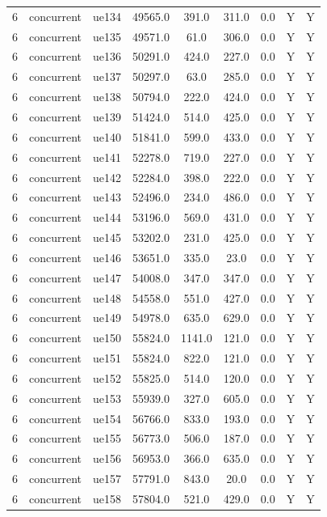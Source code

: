 \begin{table}[ht]
\begin{tabular}{|c|c|c|c|c|c|c|c|c|}
6 & concurrent & ue134 & 49565.0 & 391.0 & 311.0 & 0.0 & Y & Y \\
6 & concurrent & ue135 & 49571.0 & 61.0 & 306.0 & 0.0 & Y & Y \\
6 & concurrent & ue136 & 50291.0 & 424.0 & 227.0 & 0.0 & Y & Y \\
6 & concurrent & ue137 & 50297.0 & 63.0 & 285.0 & 0.0 & Y & Y \\
6 & concurrent & ue138 & 50794.0 & 222.0 & 424.0 & 0.0 & Y & Y \\
6 & concurrent & ue139 & 51424.0 & 514.0 & 425.0 & 0.0 & Y & Y \\
6 & concurrent & ue140 & 51841.0 & 599.0 & 433.0 & 0.0 & Y & Y \\
6 & concurrent & ue141 & 52278.0 & 719.0 & 227.0 & 0.0 & Y & Y \\
6 & concurrent & ue142 & 52284.0 & 398.0 & 222.0 & 0.0 & Y & Y \\
6 & concurrent & ue143 & 52496.0 & 234.0 & 486.0 & 0.0 & Y & Y \\
6 & concurrent & ue144 & 53196.0 & 569.0 & 431.0 & 0.0 & Y & Y \\
6 & concurrent & ue145 & 53202.0 & 231.0 & 425.0 & 0.0 & Y & Y \\
6 & concurrent & ue146 & 53651.0 & 335.0 & 23.0 & 0.0 & Y & Y \\
6 & concurrent & ue147 & 54008.0 & 347.0 & 347.0 & 0.0 & Y & Y \\
6 & concurrent & ue148 & 54558.0 & 551.0 & 427.0 & 0.0 & Y & Y \\
6 & concurrent & ue149 & 54978.0 & 635.0 & 629.0 & 0.0 & Y & Y \\
6 & concurrent & ue150 & 55824.0 & 1141.0 & 121.0 & 0.0 & Y & Y \\
6 & concurrent & ue151 & 55824.0 & 822.0 & 121.0 & 0.0 & Y & Y \\
6 & concurrent & ue152 & 55825.0 & 514.0 & 120.0 & 0.0 & Y & Y \\
6 & concurrent & ue153 & 55939.0 & 327.0 & 605.0 & 0.0 & Y & Y \\
6 & concurrent & ue154 & 56766.0 & 833.0 & 193.0 & 0.0 & Y & Y \\
6 & concurrent & ue155 & 56773.0 & 506.0 & 187.0 & 0.0 & Y & Y \\
6 & concurrent & ue156 & 56953.0 & 366.0 & 635.0 & 0.0 & Y & Y \\
6 & concurrent & ue157 & 57791.0 & 843.0 & 20.0 & 0.0 & Y & Y \\
6 & concurrent & ue158 & 57804.0 & 521.0 & 429.0 & 0.0 & Y & Y \\

\end{tabular}
\end{table}
